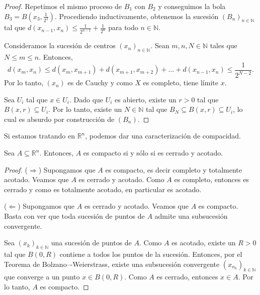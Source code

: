 \begin{proof}
	Repetimos el mismo proceso de $B_1$ con $B_2$ y conseguimos la bola $B_3 = B(x_3, \frac{1}{2^2})$. Procediendo inductivamente, obtenemos la sucesión $(B_n)_{n \in \mathbb{N}}$ tal que $d(x_{n-1}, x_{n}) \leq \frac{1}{2^{n-1}} + \frac{1}{2^n}$ para todo $n \in \mathbb{N}$.

	\begin{center}
		
	\end{center}

	Consideramos la sucesión de centros $(x_n)_{n \in \mathbb{N}}$. Sean $m, n, N \in \mathbb{N}$ tales que $N \leq m \leq n$. Entonces,
	\begin{equation*}
		d(x_m, x_n) \leq d(x_m, x_{m+1}) + d(x_{m+1}, x_{m+2}) + \dots + d(x_{n-1}, x_n) \leq \frac{1}{2^{N-2}}.
	\end{equation*}
	Por lo tanto, $(x_n)$ es de Cauchy y como $X$ es completo, tiene límite $x$.

	Sea $U_i$ tal que $x \in U_i$. Dado que $U_i$ es abierto, existe un $r > 0$ tal que $B(x, r) \subseteq U_i$. Por lo tanto, existe un $N \in \mathbb{N}$ tal que $B_{N} \subseteq B(x, r) \subseteq U_i$, lo cual es absurdo por construcción de $(B_n)$.
\end{proof}

Si estamos tratando en $\mathbb{R}^n$, podemos dar una caracterización de compacidad.

\begin{theorem}
	Sea $A \subseteq \mathbb{R}^n$. Entonces, $A$ es compacto si y sólo si es cerrado y acotado.
\end{theorem}

\begin{proof}
	($\Rightarrow$) Supongamos que $A$ es compacto, es decir completo y totalmente acotado. Veamos que $A$ es cerrado y acotado. Como $A$ es completo, entonces es cerrado y como es totalmente acotado, en particular es acotado.

	($\Leftarrow$) Supongamos que $A$ es cerrado y acotado. Veamos que $A$ es compacto. Basta con ver que toda sucesión de puntos de $A$ admite una subsucesión convergente.

	Sea $(x_k)_{k \in \mathbb{N}}$ una sucesión de puntos de $A$. Como $A$ es acotado, existe un $R > 0$ tal que $B(0, R)$ contiene a todos los puntos de la sucesión. Entonces, por el Teorema de Bolzano–-Weierstrass, existe una subsucesión convergente $(x_{n_k})_{k \in \mathbb{N}}$ que converge a un punto $x \in B(0, R)$. Como $A$ es cerrado, entonces $x \in A$. Por lo tanto, $A$ es compacto.
\end{proof}


